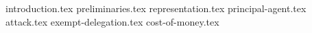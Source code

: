 {introduction.tex}
{preliminaries.tex}
{representation.tex}
{principal-agent.tex}
{attack.tex}
{exempt-delegation.tex}
\ifproceedings
\else
  {cost-of-money.tex}
\fi
